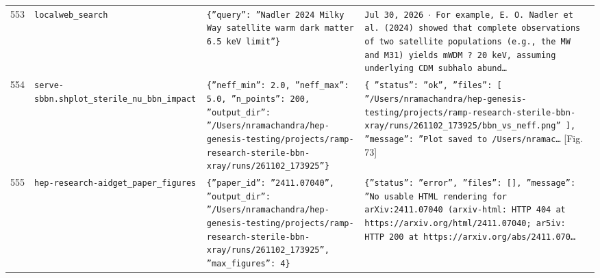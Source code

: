 \documentclass[11pt,a4paper]{article}
\begin{document}
\begin{longtable}{@{}p{}p{}p{}p{}@{}}
553 & \texttt{local}\newline\texttt{web\_\allowbreak{}search} & \texttt{\{''query'':\allowbreak{} ''Nadler 2024 Milky Way satellite warm dark matter 6.5 keV limit''\}\allowbreak{}} & \texttt{Jul 30,\allowbreak{} 2026 $\cdot$ For example,\allowbreak{} E. O. Nadler et al. (2024)\allowbreak{} showed that complete observations of two satellite populations (e.g.,\allowbreak{} the MW and M31)\allowbreak{} yields mWDM ? 20 keV,\allowbreak{} assuming underlying CDM subhalo abund\ldots{}\allowbreak{}} \\
554 & \texttt{serve-sbbn.sh}\newline\texttt{plot\_\allowbreak{}sterile\_\allowbreak{}nu\_\allowbreak{}bbn\_\allowbreak{}impact} & \texttt{\{''neff\_\allowbreak{}min'':\allowbreak{} 2.0,\allowbreak{} ''neff\_\allowbreak{}max'':\allowbreak{} 5.0,\allowbreak{} ''n\_\allowbreak{}points'':\allowbreak{} 200,\allowbreak{} ''output\_\allowbreak{}dir'':\allowbreak{} ''/\allowbreak{}Users/\allowbreak{}nramachandra/\allowbreak{}hep-genesis-testing/\allowbreak{}projects/\allowbreak{}ramp-research-sterile-bbn-xray/\allowbreak{}runs/\allowbreak{}261102\_\allowbreak{}173925''\}\allowbreak{}} & \texttt{\{   ''status'':\allowbreak{} ''ok'',\allowbreak{}   ''files'':\allowbreak{} [     ''/\allowbreak{}Users/\allowbreak{}nramachandra/\allowbreak{}hep-genesis-testing/\allowbreak{}projects/\allowbreak{}ramp-research-sterile-bbn-xray/\allowbreak{}runs/\allowbreak{}261102\_\allowbreak{}173925/\allowbreak{}bbn\_\allowbreak{}vs\_\allowbreak{}neff.png''   ]\allowbreak{},\allowbreak{}   ''message'':\allowbreak{} ''Plot saved to /\allowbreak{}Users/\allowbreak{}nramac\ldots{}\allowbreak{}} [Fig. 73] \\
555 & \texttt{hep-research-aid}\newline\texttt{get\_\allowbreak{}paper\_\allowbreak{}figures} & \texttt{\{''paper\_\allowbreak{}id'':\allowbreak{} ''2411.07040'',\allowbreak{} ''output\_\allowbreak{}dir'':\allowbreak{} ''/\allowbreak{}Users/\allowbreak{}nramachandra/\allowbreak{}hep-genesis-testing/\allowbreak{}projects/\allowbreak{}ramp-research-sterile-bbn-xray/\allowbreak{}runs/\allowbreak{}261102\_\allowbreak{}173925'',\allowbreak{} ''max\_\allowbreak{}figures'':\allowbreak{} 4\}\allowbreak{}} & \texttt{\{''status'':\allowbreak{} ''error'',\allowbreak{} ''files'':\allowbreak{} []\allowbreak{},\allowbreak{} ''message'':\allowbreak{} ''No usable HTML rendering for arXiv:\allowbreak{}2411.07040 (arxiv-html:\allowbreak{} HTTP 404 at https:\allowbreak{}/\allowbreak{}/\allowbreak{}arxiv.org/\allowbreak{}html/\allowbreak{}2411.07040;\allowbreak{} ar5iv:\allowbreak{} HTTP 200 at https:\allowbreak{}/\allowbreak{}/\allowbreak{}arxiv.org/\allowbreak{}abs/\allowbreak{}2411.070\ldots{}\allowbreak{}} \\

\end{longtable}
\end{document}
